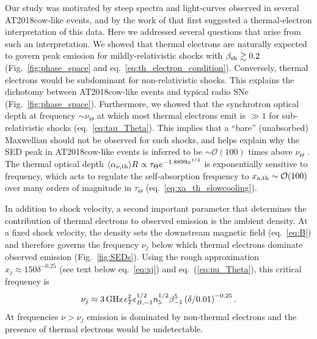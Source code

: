 \documentclass[twocolumn]{aastex63}
\begin{document}
Our study was motivated by steep spectra and light-curves observed in several AT2018cow-like events, and by the work of \cite{Ho+21b} that first suggested a thermal-electron interpretation of this data.
Here we addressed several questions that arise from such an interpretation. We showed that thermal electrons are naturally expected to govern peak emission for mildly-relativistic shocks with $\beta_{\rm sh} \gtrsim 0.2$ (Fig.~\ref{fig:phase_space} and eq.~\ref{eq:th_electron_condition}). Conversely, thermal electrons would be subdominant for non-relativistic shocks. This explains the dichotomy between AT2018cow-like events and typical radio SNe (Fig.~\ref{fig:phase_space}).
Furthermore, we showed that the synchrotron optical depth 
at frequency $\sim \nu_\Theta$ at which most thermal electrons emit is $\gg 1$ for sub-relativistic shocks (eq.~\ref{eq:tau_Theta}). This implies that a ``bare'' (unabsorbed) Maxwellian should not be observed for such shocks, and helps explain why the SED peak in AT2018cow-like events is inferred to be $\sim \mathcal{O}(100)$ times above $\nu_\Theta$ \citep{Ho+21b}.
The thermal optical depth $\langle \alpha_{\nu,{\rm th}} \rangle R \propto \tau_\Theta e^{-1.8899 x^{1/3}}$ is exponentially sensitive to frequency, which acts to regulate the self-absorption frequency to $x_{\rm a, th} \sim \mathcal{O}(100)$ over many orders of magnitude in $\tau_\Theta$ (eq.~\ref{eq:xa_th_slowcooling}).

In addition to shock velocity, a second important parameter that determines the contribution of thermal electrons to observed emission is the ambient density. At a fixed shock velocity, the density sets the downstream magnetic field (eq.~\ref{eq:B}) and therefore governs the frequency 
$\nu_j$ below which thermal electrons dominate observed emission (Fig.~\ref{fig:SEDs}).
Using the rough approximation $x_j \approx 150 \delta^{-0.25}$ (see text below eq.~\ref{eq:xj}) and eq.~(\ref{eq:nu_Theta}), this critical frequency is
\begin{equation}
\label{eq:nu_j}
    \nu_j 
    \approx
    3 \,{\rm GHz}\, \epsilon_T^2 \epsilon_{B,-1}^{1/2} n_5^{1/2} \beta_{-1}^5
    \left({\delta}/{0.01}\right)^{-0.25}
    .
\end{equation}
At frequencies $\nu > \nu_j$ emission is dominated by non-thermal electrons and the presence of thermal electrons would be undetectable. 
\end{document}
